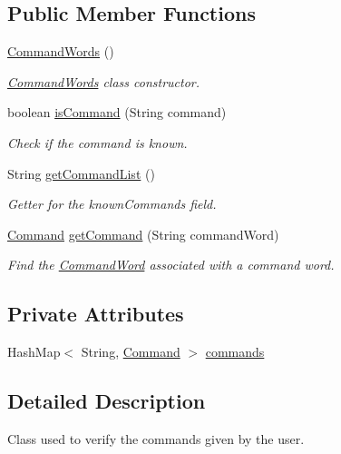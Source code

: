 \subsection*{Public Member Functions}
\begin{DoxyCompactItemize}
\item 
\hyperlink{classCommandWords_a2d8c096723adb3f822cc001bccd92ed7}{Command\-Words} ()
\begin{DoxyCompactList}\small\item\em \hyperlink{classCommandWords}{Command\-Words} class constructor. \end{DoxyCompactList}\item 
boolean \hyperlink{classCommandWords_a646ed94a6d8d190b7cc445378ee2306e}{is\-Command} (String command)
\begin{DoxyCompactList}\small\item\em Check if the command is known. \end{DoxyCompactList}\item 
String \hyperlink{classCommandWords_aa26f54985e39543739e0ae291dcdb8f1}{get\-Command\-List} ()
\begin{DoxyCompactList}\small\item\em Getter for the known\-Commands field. \end{DoxyCompactList}\item 
\hyperlink{classCommand}{Command} \hyperlink{classCommandWords_af89bc564e4cf32021721ca44f46de6cb}{get\-Command} (String command\-Word)
\begin{DoxyCompactList}\small\item\em Find the \hyperlink{enumCommandWord}{Command\-Word} associated with a command word. \end{DoxyCompactList}\end{DoxyCompactItemize}
\subsection*{Private Attributes}
\begin{DoxyCompactItemize}
\item 
Hash\-Map$<$ String, \hyperlink{classCommand}{Command} $>$ \hyperlink{classCommandWords_a87d12c01410f3c523f7889d523d537e7}{commands}
\end{DoxyCompactItemize}


\subsection{Detailed Description}
Class used to verify the commands given by the user. 

